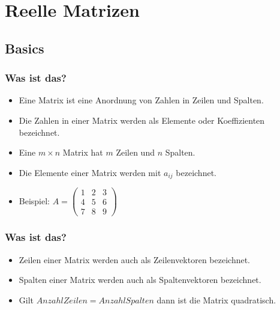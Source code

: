 \section{Reelle Matrizen}

\subsection{Basics}
\begin{frame}
    \frametitle{Was ist das?}
    \begin{itemize}
        \item Eine Matrix ist eine Anordnung von Zahlen in Zeilen und Spalten.
        \item Die Zahlen in einer Matrix werden als Elemente oder Koeffizienten bezeichnet.
        \item Eine $m \times n$ Matrix hat $m$ Zeilen und $n$ Spalten.
        \item Die Elemente einer Matrix werden mit $a_{ij}$ bezeichnet.
        \item Beispiel: $A = \begin{pmatrix}
                                 1 & 2 & 3 \\
                                 4 & 5 & 6 \\
                                 7 & 8 & 9
        \end{pmatrix}$
    \end{itemize}
\end{frame}

\begin{frame}
    \frametitle{Was ist das?}
    \begin{itemize}
        \item Zeilen einer Matrix werden auch als Zeilenvektoren bezeichnet.
        \item Spalten einer Matrix werden auch als Spaltenvektoren bezeichnet.
        \item Gilt $Anzahl Zeilen = Anzahl Spalten$ dann ist die Matrix quadratisch.
    \end{itemize}
\end{frame}

